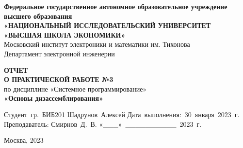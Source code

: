 
\begin{titlepage}
        \begin{center}

            \timesfont
            {\large\bf\timesfont Федеральное‌ ‌государственное‌ ‌автономное‌ ‌образовательное‌ ‌учреждение‌ ‌высшего‌ образования\\}
            {\large\bf\timesfont «НАЦИОНАЛЬНЫЙ‌ ‌ИССЛЕДОВАТЕЛЬСКИЙ‌ ‌УНИВЕРСИТЕТ‌ «ВЫСШАЯ‌ ‌ШКОЛА‌ ‌ЭКОНОМИКИ»‌\\}
            Московский‌ ‌институт‌ ‌электроники‌ ‌и‌ ‌математики‌ ‌им. Тихонова‌\\
            Департамент‌ ‌электронной‌ ‌инженерии‌\\

            \vfill
            \vfill

            {\bf\timesfont ОТЧЕТ \\
                О ПРАКТИЧЕСКОЙ РАБОТЕ №3}\\
            по дисциплине «Системное программирование»\\
            {\bf\timesfont «Основы дизассемблирования»}\\


            \vfill
            \vfill
            \vfill

            \hfill\vbox
            {
                \hbox{Студент гр. БИБ201}
                \hbox{Шадрунов Алексей}
                \hbox{Дата выполнения: 30 января 2023 г.}
                \hbox{}
                \hbox{Преподаватель:}
                \hbox{Смирнов Д. В.}
                \hbox{«\_\_\_» \_\_\_\_\_\_\_\_\_\_ 2023 г.}
            }

            \vfill

            Москва, 2023
        \end{center}
\end{titlepage}
